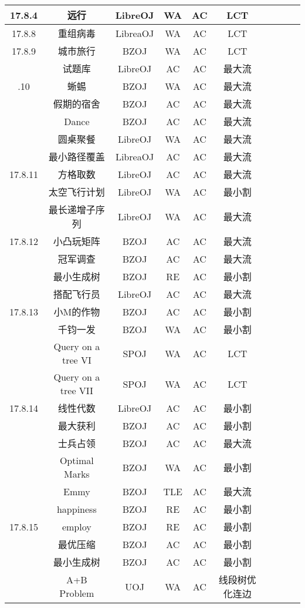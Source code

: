 \documentclass[landscape]{article}
\begin{document}
\begin{longtable}{cccccccccc}
  \hline
  17.8.4 & 远行 & LibreOJ & WA & AC & LCT\\
  \hline
  17.8.8 & 重组病毒 & LibreaOJ & WA & AC & LCT\\
  \hline 
  17.8.9 & 城市旅行 & BZOJ & WA & AC & LCT\\
  & 试题库 & LibreOJ & AC & AC & 最大流\\
  \newpage
  \hline
  17.8.10 & 蜥蜴 & BZOJ & WA & AC & 最大流\\
  & 假期的宿舍 & BZOJ & AC & AC & 最大流\\
  & Dance & BZOJ & AC & AC & 最大流\\
  & 圆桌聚餐 & LibreOJ & WA & AC & 最大流\\
  & 最小路径覆盖 & LibreaOJ & AC & AC & 最大流\\
  \hline
  17.8.11 & 方格取数 & LibreOJ & AC & AC & 最大流\\
  & 太空飞行计划 & LibreOJ & WA & AC & 最小割\\
  & 最长递增子序列 & LibreOJ & WA & AC & 最大流\\
  \hline
  17.8.12 & 小凸玩矩阵 & BZOJ & AC & AC & 最大流\\
  & 冠军调查 & BZOJ & AC & AC& 最大流\\
  & 最小生成树 & BZOJ & RE & AC & 最小割\\
  & 搭配飞行员 & LibreOJ & AC & AC & 最大流\\
  \hline
  17.8.13 & 小M的作物 & BZOJ & AC & AC & 最小割\\
  & 千钧一发 & BZOJ & WA & AC & 最小割\\
  & Query on a tree VI & SPOJ & WA & AC & LCT\\
  & Query on a tree VII & SPOJ & WA & AC & LCT\\
  \hline
  17.8.14 & 线性代数 & LibreOJ & AC & AC & 最小割\\
  & 最大获利 & BZOJ & AC & AC & 最小割\\
  & 士兵占领 & BZOJ & AC & AC & 最大流\\
  & Optimal Marks & BZOJ & WA & AC & 最小割\\
  & Emmy & BZOJ & TLE & AC & 最大流\\
  & happiness & BZOJ & RE & AC & 最小割\\
  \hline
  17.8.15 & employ & BZOJ & RE & AC & 最小割\\
  & 最优压缩 & BZOJ & AC & AC & 最小割\\
  & 最小生成树 & BZOJ & AC & AC & 最小割\\
  & A+B Problem & UOJ & WA & AC & 线段树优化连边\\

\end{longtable}
\end{document}
